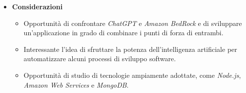 \documentclass{article}
\begin{document}
\begin{itemize}
    \item[] \textbf{Considerazioni}
    \begin{itemize}
        \item Opportunità di confrontare \textit{ChatGPT} e \textit{Amazon BedRock} e di sviluppare un'applicazione in grado di combinare i punti di forza di entrambi.
        \item Interessante l'idea di sfruttare la potenza dell'intelligenza artificiale per automatizzare alcuni processi di sviluppo software.
        \item Opportunità di studio di tecnologie ampiamente adottate, come \textit{Node.js}, \textit{Amazon Web Services} e \textit{MongoDB}.
    \end{itemize} 

\end{itemize}
\pagebreak

\end{document}
